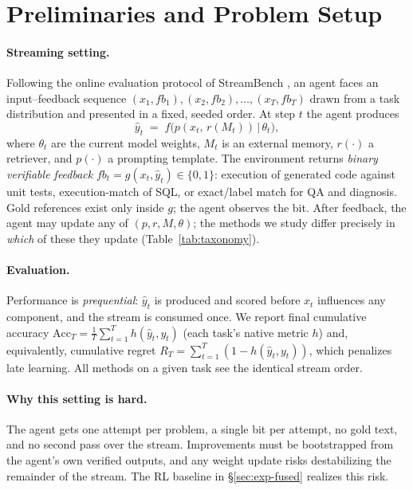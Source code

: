 \section{Preliminaries and Problem Setup}
\label{sec:formulation}

\paragraph{Streaming setting.} Following the online evaluation protocol of
StreamBench \citep{wu2024streambench}, an agent faces an input--feedback sequence
$(x_1, fb_1), (x_2, fb_2), \dots, (x_T, fb_T)$ drawn from a task distribution and
presented in a fixed, seeded order. At step $t$ the agent produces
\begin{equation}
\hat y_t \;=\; f\!\big(p(x_t,\, r(M_t)) \,\big|\, \theta_t\big),
\end{equation}
where $\theta_t$ are the current model weights, $M_t$ is an external memory,
$r(\cdot)$ a retriever, and $p(\cdot)$ a prompting template. The environment
returns \emph{binary verifiable feedback}
$fb_t = g(x_t, \hat y_t) \in \{0, 1\}$: execution of generated code against unit
tests, execution-match of SQL, or exact/label match for QA and diagnosis. Gold
references exist only inside $g$; the agent observes the bit. After feedback, the
agent may update any of $(p, r, M, \theta)$; the methods we study differ precisely
in \emph{which} of these they update (Table~\ref{tab:taxonomy}).

\paragraph{Evaluation.} Performance is \emph{prequential}: $\hat y_t$ is produced
and scored before $x_t$ influences any component, and the stream is consumed once.
We report final cumulative accuracy
$\mathrm{Acc}_T = \tfrac{1}{T}\sum_{t=1}^{T} h(\hat y_t, y_t)$
(each task's native metric $h$) and, equivalently, cumulative regret
$R_T = \sum_{t=1}^{T} (1 - h(\hat y_t, y_t))$, which penalizes late learning.
All methods on a given task see the identical stream order.

\paragraph{Why this setting is hard.} The agent gets one attempt per problem, a single bit per attempt, no gold
text, and no second pass over the stream.
Improvements must be bootstrapped from the agent's own verified outputs, and
any weight update risks destabilizing the remainder of the stream. The RL
baseline in \S\ref{sec:exp-fused} realizes this risk.


